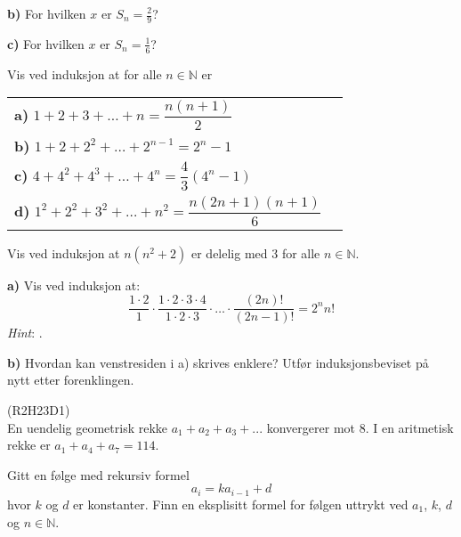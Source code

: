 \textbf{b)} For hvilken $ x $ er $ S_n = \frac{2}{9} $?\os

\textbf{c)} For hvilken $ x $ er $ S_n= \frac{1}{6}$? \os

\nes
{}
Vis ved induksjon at for alle $ n\in \mathbb{N} $ er\\[10pt]
\begin{tabular}{@{}l l}	
	\textbf{a)} $ 1+2+3+\ldots+n = \dfrac{n(n+1)}{2} $ \\[10pt]
	\textbf{b)} $ 1+2 +2^2 +\ldots+ 2^{n-1}= 2^n-1$\\[10pt]
	\textbf{c)} $ 4+4^2+4^3+\ldots+4^n = \dfrac{4}{3}(4^n-1) $ \\[10pt]
	\textbf{d)} $ 1^2 + 2^2+3^2+ \ldots+ n^2 = \dfrac{n(2n+1)(n+1)}{6} $ 
\end{tabular} 

Vis ved induksjon at $ n(n^2+2) $ er delelig med 3 for alle $ n\in\mathbb{N} $.

\textbf{a)}
Vis ved induksjon at:
\[\frac{1\cdot2}{1}\cdot\frac{1\cdot2\cdot3\cdot4}{1\cdot2\cdot3}\cdot
\ldots\cdot\frac{(2n)!}{(2n-1)!}=2^n n! \]
\textsl{Hint}: .\os

\textbf{b)} Hvordan kan venstresiden i a) skrives enklere? Utfør induksjonsbeviset på nytt etter forenklingen.
\newpage
{}

 (R2H23D1) \\
En uendelig geometrisk rekke $ a_1+a_2+a_3+... $ konvergerer mot 8.
I en aritmetisk rekke er $ a_1+a_4+a_7 =114 $.

Gitt en følge med rekursiv formel
\[ a_i = ka_{i-1}+d \]
hvor $ k $ og $ d $ er konstanter. Finn en eksplisitt formel for følgen uttrykt ved $ a_1 $, $ k $, $ d $ og $ n\in\mathbb{N} $.

